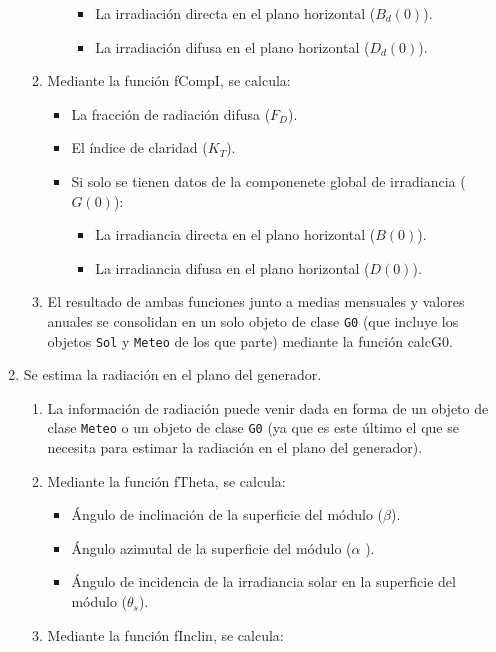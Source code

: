 \begin{enumerate}
\begin{enumerate}
\begin{itemize}
\begin{itemize}
\item La irradiación directa en el plano horizontal (\(B_d(0)\)).
\item La irradiación difusa en el plano horizontal (\(D_d(0)\)).
\end{itemize}
\end{itemize}
\item Mediante la función fCompI, se calcula:
\begin{itemize}
\item La fracción de radiación difusa (\(F_D\)).
\item El índice de claridad (\(K_T\)).
\item Si solo se tienen datos de la componenete global de irradiancia (\(G(0)\)):
\begin{itemize}
\item La irradiancia directa en el plano horizontal (\(B(0)\)).
\item La irradiancia difusa en el plano horizontal (\(D(0)\)).
\end{itemize}
\end{itemize}
\item El resultado de ambas funciones junto a medias mensuales y valores anuales se consolidan en un solo objeto de clase \texttt{G0} (que incluye los objetos \texttt{Sol} y \texttt{Meteo} de los que parte) mediante la función calcG0.
\end{enumerate}
\item Se estima la radiación en el plano del generador.
\begin{enumerate}
\item La información de radiación puede venir dada en forma de un objeto de clase \texttt{Meteo} o un objeto de clase \texttt{G0} (ya que es este último el que se necesita para estimar la radiación en el plano del generador).
\item Mediante la función fTheta, se calcula:
\begin{itemize}
\item Ángulo de inclinación de la superficie del módulo (\(\beta\)).
\item Ángulo azimutal de la superficie del módulo (\(\alpha\) ).
\item Ángulo de incidencia de la irradiancia solar en la superficie del módulo (\(\theta_s\)).
\end{itemize}
\item Mediante la función fInclin, se calcula:
\begin{itemize}

\end{itemize}
\end{enumerate}
\end{enumerate}
